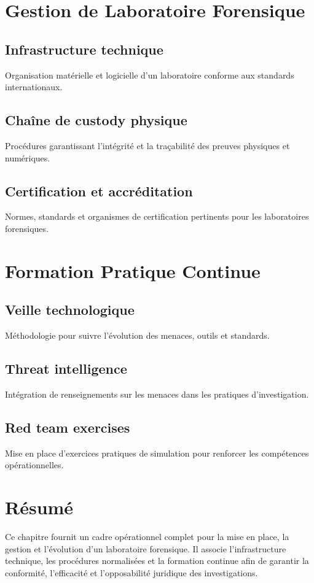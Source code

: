 \section{Gestion de Laboratoire Forensique}\label{sec:gestion_lab}
\subsection{Infrastructure technique}
Organisation matérielle et logicielle d’un laboratoire conforme aux standards internationaux.

\subsection{Chaîne de custody physique}
Procédures garantissant l’intégrité et la traçabilité des preuves physiques et numériques.

\subsection{Certification et accréditation}
Normes, standards et organismes de certification pertinents pour les laboratoires forensiques.

\section{Formation Pratique Continue}\label{sec:formation}
\subsection{Veille technologique}
Méthodologie pour suivre l’évolution des menaces, outils et standards.

\subsection{Threat intelligence}
Intégration de renseignements sur les menaces dans les pratiques d’investigation.

\subsection{Red team exercises}
Mise en place d’exercices pratiques de simulation pour renforcer les compétences opérationnelles.

\section*{Résumé}
Ce chapitre fournit un cadre opérationnel complet pour la mise en place, la gestion et l’évolution d’un laboratoire forensique. Il associe l’infrastructure technique, les procédures normalisées et la formation continue afin de garantir la conformité, l’efficacité et l’opposabilité juridique des investigations.
